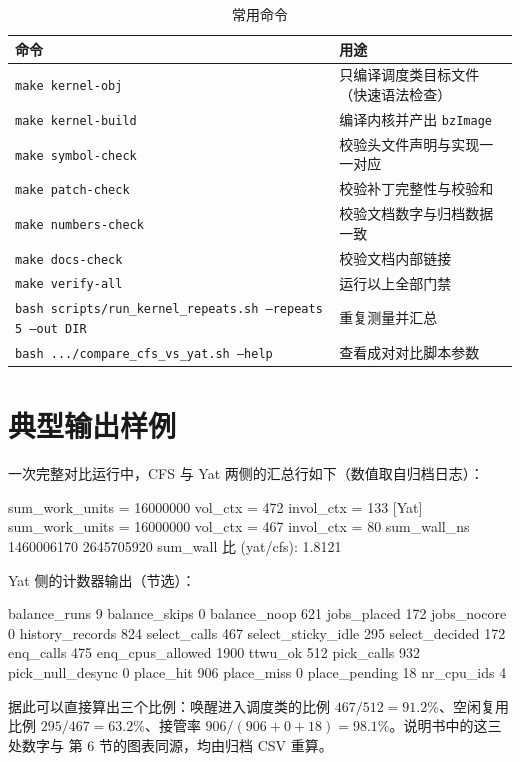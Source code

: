 \documentclass[11pt,a4paper]{article}
\newcommand{\code}[1]{\texttt{#1}}
\newenvironment{shell}{\Verbatim[fontsize=\small,frame=single,framesep=4pt]}{\endVerbatim}
\begin{document}
\begin{table}[H]
\centering
\caption{常用命令}
\label{tab:cmds}
\small
\begin{tabular}{@{}p{7.2cm}p{6.8cm}@{}}
\toprule
命令 & 用途 \\
\midrule
\code{make kernel-obj} & 只编译调度类目标文件（快速语法检查） \\
\code{make kernel-build} & 编译内核并产出 \code{bzImage} \\
\code{make symbol-check} & 校验头文件声明与实现一一对应 \\
\code{make patch-check} & 校验补丁完整性与校验和 \\
\code{make numbers-check} & 校验文档数字与归档数据一致 \\
\code{make docs-check} & 校验文档内部链接 \\
\code{make verify-all} & 运行以上全部门禁 \\
\code{bash scripts/run\_kernel\_repeats.sh --repeats 5 --out DIR} & 重复测量并汇总 \\
\code{bash .../compare\_cfs\_vs\_yat.sh --help} & 查看成对对比脚本参数 \\
\bottomrule
\end{tabular}
\end{table}

\section{典型输出样例}

一次完整对比运行中，CFS 与 Yat 两侧的汇总行如下（数值取自归档日志）：

\begin{shell}
[CFS] sum_work_units = 16000000   vol_ctx = 472   invol_ctx = 133
[Yat] sum_work_units = 16000000   vol_ctx = 467   invol_ctx = 80
sum_wall_ns     1460006170       2645705920
sum_wall 比 (yat/cfs): 1.8121
\end{shell}

Yat 侧的计数器输出（节选）：

\begin{shell}
balance_runs      9
balance_skips     0
balance_noop      621
jobs_placed       172
jobs_nocore       0
history_records   824
select_calls      467
select_sticky_idle 295
select_decided    172
enq_calls         475
enq_cpus_allowed  1900
ttwu_ok           512
pick_calls        932
pick_null_desync  0
place_hit         906
place_miss        0
place_pending     18
nr_cpu_ids        4
\end{shell}

据此可以直接算出三个比例：唤醒进入调度类的比例 $467/512=91.2\%$、空闲复用比例
$295/467=63.2\%$、接管率 $906/(906+0+18)=98.1\%$。说明书中的这三处数字与
第 6 节的图表同源，均由归档 CSV 重算。
\end{document}
